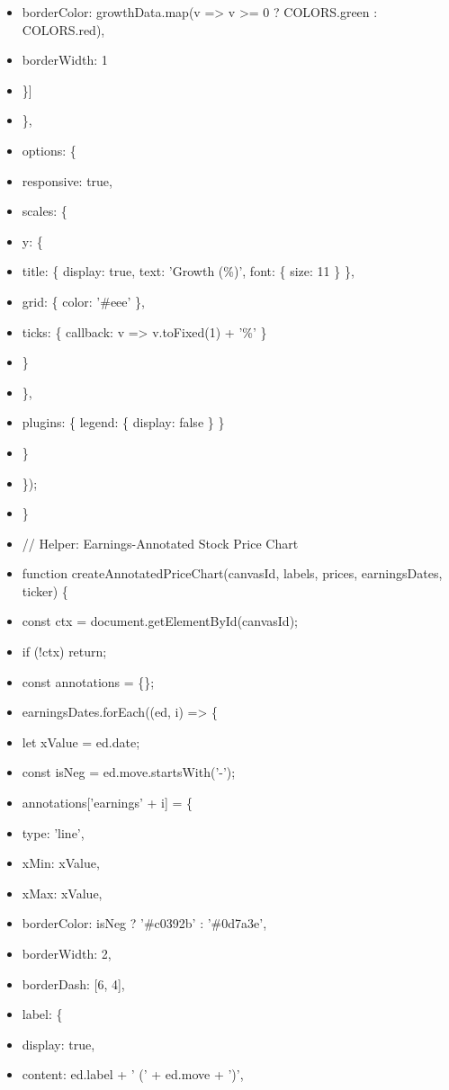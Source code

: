\documentclass[11pt]{article}
\begin{document}
\begin{itemize}[leftmargin=*,itemsep=2pt,topsep=2pt]
\item {} borderColor: growthData.map(v => v >= 0 ? COLORS.green : COLORS.red),
\item {} borderWidth: 1
\item {} \}]
\item {} \},
\item {} options: \{
\item {} responsive: true,
\item {} scales: \{
\item {} y: \{
\item {} title: \{ display: true, text: 'Growth (\%)', font: \{ size: 11 \} \},
\item {} grid: \{ color: '\#eee' \},
\item {} ticks: \{ callback: v => v.toFixed(1) + '\%' \}
\item {} \}
\item {} \},
\item {} plugins: \{ legend: \{ display: false \} \}
\item {} \}
\item {} \});
\item {} \}
\item {} // Helper: Earnings-Annotated Stock Price Chart
\item {} function createAnnotatedPriceChart(canvasId, labels, prices, earningsDates, ticker) \{
\item {} const ctx = document.getElementById(canvasId);
\item {} if (!ctx) return;
\item {} const annotations = \{\};
\item {} earningsDates.forEach((ed, i) => \{
\item {} let xValue = ed.date;
\item {} const isNeg = ed.move.startsWith('-');
\item {} annotations['earnings' + i] = \{
\item {} type: 'line',
\item {} xMin: xValue,
\item {} xMax: xValue,
\item {} borderColor: isNeg ? '\#c0392b' : '\#0d7a3e',
\item {} borderWidth: 2,
\item {} borderDash: [6, 4],
\item {} label: \{
\item {} display: true,
\item {} content: ed.label + ' (' + ed.move + ')',

\end{itemize}
\end{document}

